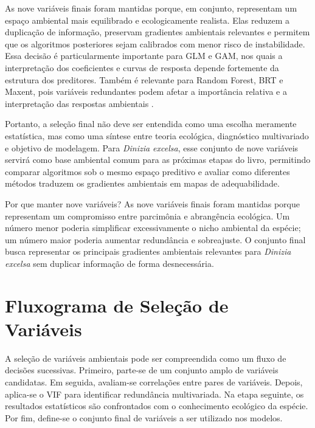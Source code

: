 As nove variáveis finais foram mantidas porque, em conjunto, representam um espaço ambiental mais equilibrado e ecologicamente realista. Elas reduzem a duplicação de informação, preservam gradientes ambientais relevantes e permitem que os algoritmos posteriores sejam calibrados com menor risco de instabilidade. Essa decisão é particularmente importante para GLM e GAM, nos quais a interpretação dos coeficientes e curvas de resposta depende fortemente da estrutura dos preditores. Também é relevante para Random Forest, BRT e Maxent, pois variáveis redundantes podem afetar a importância relativa e a interpretação das respostas ambientais \parencite{elith2008working,dormann2013collinearity}.

Portanto, a seleção final não deve ser entendida como uma escolha meramente estatística, mas como uma síntese entre teoria ecológica, diagnóstico multivariado e objetivo de modelagem. Para \textit{Dinizia excelsa}, esse conjunto de nove variáveis servirá como base ambiental comum para as próximas etapas do livro, permitindo comparar algoritmos sob o mesmo espaço preditivo e avaliar como diferentes métodos traduzem os gradientes ambientais em mapas de adequabilidade.

\begin{caixaaplicacao}{Por que manter nove variáveis?}
	As nove variáveis finais foram mantidas porque representam um compromisso entre parcimônia e abrangência ecológica. Um número menor poderia simplificar excessivamente o nicho ambiental da espécie; um número maior poderia aumentar redundância e sobreajuste. O conjunto final busca representar os principais gradientes ambientais relevantes para \textit{Dinizia excelsa} sem duplicar informação de forma desnecessária.
\end{caixaaplicacao}

\section{Fluxograma de Seleção de Variáveis}

A seleção de variáveis ambientais pode ser compreendida como um fluxo de decisões sucessivas. Primeiro, parte-se de um conjunto amplo de variáveis candidatas. Em seguida, avaliam-se correlações entre pares de variáveis. Depois, aplica-se o VIF para identificar redundância multivariada. Na etapa seguinte, os resultados estatísticos são confrontados com o conhecimento ecológico da espécie. Por fim, define-se o conjunto final de variáveis a ser utilizado nos modelos.

